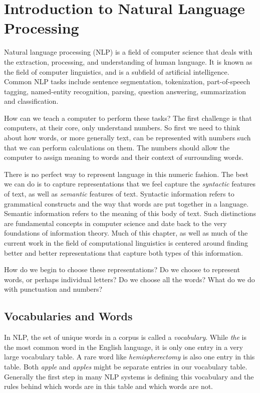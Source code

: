 \section{Introduction to Natural Language Processing}

Natural language processing (NLP) is a field of computer science that deals with the extraction, processing, and understanding of human language.
It is known as the field of computer linguistics, and is a subfield of artificial intelligence.
Common NLP tasks include sentence segmentation, tokenization, part-of-speech tagging, named-entity recognition, parsing, question answering, summarization and classification.

How can we teach a computer to perform these tasks?
The first challenge is that computers, at their core, only understand numbers.
So first we need to think about how words, or more generally text, can be represented with numbers such that we can perform calculations on them.
The numbers should allow the computer to assign meaning to words and their context of surrounding words.

There is no perfect way to represent language in this numeric fashion. The best we can do is to capture representations that we feel capture the \textit{syntactic} features of text, as well as \textit{semantic} features of text.
Syntactic information refers to grammatical constructs and the way that words are put together in a language. Semantic information refers to the meaning of this body of text. Such distinctions are fundamental concepts in computer science
and date back to the very foundations of information theory. \cite{shannon48}
Much of this chapter, as well as much of the current work in the field of computational linguistics is centered around finding better and better representations that capture both types of this information.

How do we begin to choose these representations?
Do we choose to represent words, or perhaps individual letters?
Do we choose all the words?
What do we do with punctuation and numbers?

\subsection{Vocabularies and Words}
\label{vocabularies_and_words}
In NLP, the set of unique words in a corpus is called a \textit{vocabulary}. While \textit{the} is the most common word in the English language, it is only one entry in a very large vocabulary table. A rare word like \textit{hemispherectomy} is also one
entry in this table. Both \textit{apple} and \textit{apples} might be separate entries in our vocabulary table. Generally the first step in many NLP systems is defining this vocabulary and the rules behind which words are in this table and which words are not.

